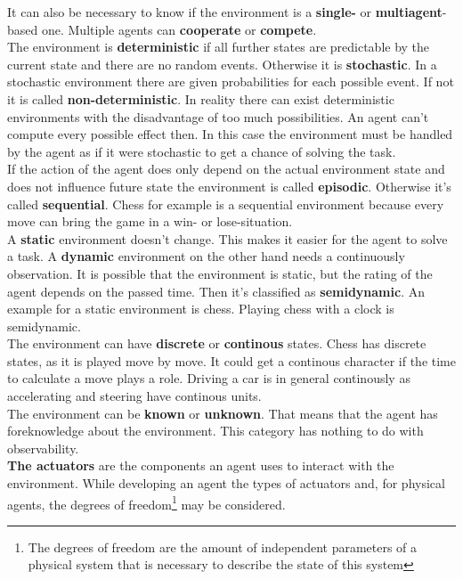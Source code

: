 \documentclass[10pt,a4paper,DIV=11]{scrreprt}
\begin{document}
It can also be necessary to know if the environment is a \textbf{single-} or \textbf{multiagent}-based one. Multiple agents can \textbf{cooperate} or \textbf{compete}. \\

The environment is \textbf{deterministic} if all further states are predictable by the current state and there are no random events. Otherwise it is \textbf{stochastic}.
In a stochastic environment there are given probabilities for each possible event. If not it is called \textbf{non-deterministic}.
In reality there can exist deterministic environments with the disadvantage of too much possibilities. An agent can't  compute every possible effect then.
In this case the environment must be handled by the agent as if it were stochastic to get a chance of solving the task. \\

If the action of the agent does only depend on the actual environment state and does not influence future state the environment is called \textbf{episodic}. Otherwise it's called
\textbf{sequential}. Chess for example is a sequential environment because every move can bring the game in a win- or lose-situation. \\

A \textbf{static} environment doesn't change. This makes it easier for the agent to solve a task. A \textbf{dynamic} environment on the other hand needs a continuously observation.
It is possible that the environment is static, but the rating of the agent depends on the passed time. Then it's classified as \textbf{semidynamic}. An example for a static environment is chess. Playing chess with a clock is semidynamic. \\

The environment can have \textbf{discrete} or \textbf{continous} states. Chess has discrete states, as it is played move by move. It could get a continous character if the time to calculate a move plays a role. Driving a car is in general continously as accelerating and steering have continous units.\\

The environment can be \textbf{known} or \textbf{unknown}. That means that the agent has foreknowledge about the environment. This category has nothing to do with observability. \\


\textbf{The actuators} are the components an agent uses to interact with the environment. While developing an agent the types of actuators and, for physical agents, the degrees of freedom\footnote{The degrees of freedom are the amount of independent parameters of a physical system that is necessary to describe the state of this system} may be considered.\\
\end{document}
